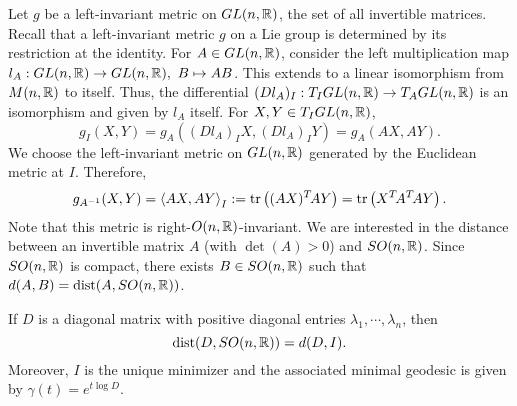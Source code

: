 \hfb Let $g$ be a left-invariant metric on $GL(n,\mathbb{R})$, the set of all invertible matrices. Recall that a left-invariant metric $g$ on a Lie group is determined by its restriction at the identity. For $A\in GL(n,\mathbb{R})$, consider the left multiplication map $l_A:GL(n,\mathbb{R}) \to GL(n,\mathbb{R}),~ B\mapsto AB$. This extends to a linear isomorphism from $M(n,\mathbb{R})$ to itself. Thus, the differential $(Dl_A)_I:T_IGL(n,\mathbb{R})\to T_AGL(n,\mathbb{R})$ is an isomorphism and given by $l_A$ itself. For $X,Y\in T_IGL(n,\mathbb{R})$, 
	\begin{equation*} \label{eq: left-invariant iso}
		g_I(X,Y) = g_A((Dl_A)_IX,(Dl_A)_IY)=g_A(AX,AY).
	\end{equation*}
We choose the left-invariant metric on $GL(n,\mathbb{R})$ generated by the Euclidean metric at $I$. Therefore,
\begin{displaymath}
    g_{A^{-1}}(X,Y) = \left\langle AX,AY\right\rangle_I := \mathrm{tr}\left( (AX)^T\!AY \right) = \mathrm{tr}\left( X^T\!A^T\!AY \right).
\end{displaymath}
Note that this metric is right-$O(n,\mathbb{R})$-invariant. We are interested in the distance between an invertible matrix $A$ (with $\det(A)>0$) and $SO(n,\mathbb{R})$. Since $SO(n,\mathbb{R})$ is compact, there exists $B\in SO(n,\mathbb{R}) $ such that $d(A,B) = \operatorname{dist}(A,SO(n,\mathbb{R}))$. 
\begin{lemma}\label{CartanGLn}
    If $D$ is a diagonal matrix with positive diagonal entries $\lambda_1,\cdots,\lambda_n$, then 
    \begin{displaymath}
        \operatorname{dist}(D,SO(n,\mathbb{R})) = d(D,I).
    \end{displaymath}
    Moreover, $I$ is the unique minimizer and the associated minimal geodesic is given by $\gamma(t)=e^{t\log D}$.
\end{lemma}
